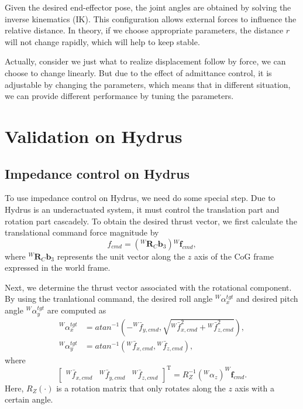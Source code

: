 
Given the desired end-effector pose, the joint angles are obtained by solving the inverse kinematics (IK). This configuration allows external forces to influence the relative distance.
In theory, if we choose appropriate parameters, the distance $r$ will not change rapidly, which will help to keep stable.

Actually, consider we just what to realize displacement follow by force, we can choose to change linearly. But due to the effect of admittance control, it is adjustable by changing the parameters, which means that in different situation, we can provide different performance by tuning the parameters.




\section{Validation on Hydrus}
\subsection{Impedance control on Hydrus}
To use impedance control on Hydrus, we need do some special step. Due to Hydrus is an underactuated system, it must control the translation part and rotation part cascadely.
To obtain the desired thrust vector, we first calculate the translational command force magnitude by
\begin{equation}
\label{eq:thrust translation 1}
    f_{cmd}=(^W\!\boldsymbol{R}_{C}\boldsymbol{b}_3){^W\!\boldsymbol{f}_{cmd}},
\end{equation}
where $^{W}\boldsymbol{R}_{C}\boldsymbol{b}_3$ represents the unit vector along the $z$ axis of the CoG frame expressed in the world frame.

Next, we determine the thrust vector associated with the rotational component. By using the tranlational command, the desired roll angle $^W\!\alpha^{tgt}_x$ and desired pitch angle $^W\!\alpha^{tgt}_y$ are computed as
\begin{subequations}
\label{eq:target roll and pitch angle}
\begin{align}
    {^W\!\alpha^{tgt}_x}&=atan^{-1}(-{^W\!\bar{f}_{y,cmd}},\sqrt{{^W\!\bar{f}_{x,cmd}^2}+{^W\!\bar{f}_{z,cmd}^2}}), \\[2pt]
    {^W\!\alpha^{tgt}_y}&=atan^{-1}(^W\!\bar{f}_{x,cmd},{^W\!\bar{f}_{z,cmd}}),
\end{align}
\end{subequations}
where
\begin{equation}
\label{eq:imp cmd for trans}
    \begin{bmatrix}
^W\!\bar{f}_{x,cmd} & ^W\!\bar{f}_{y,cmd} & ^W\!\bar{f}_{z,cmd}
\end{bmatrix}^{\mathrm{T}}=R^{-1}_Z(^W\!\alpha_z)^W\!\boldsymbol{f}_{cmd}.
\end{equation}
Here, $R_Z(\cdot{})$ is a rotation matrix that only rotates along the $z$ axis with a certain angle.

